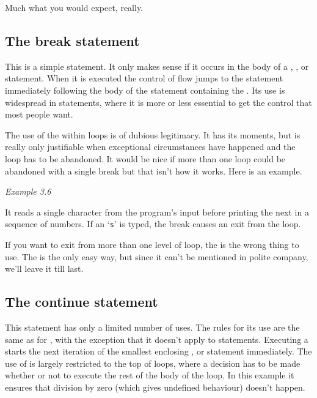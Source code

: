     Much what you would expect, really.


   

  

  \subsection{The break statement}
   

   This is a simple statement. It only makes sense if it occurs in the body
    of a \switch, \kdo, \while{} or
    \for{} statement. When it is executed the control of flow jumps
    to the statement immediately following the body of the statement
    containing the \kbreak. Its use is widespread in
    \switch{} statements, where it is more or less essential to get
    the control that most people want.


   The use of the \kbreak{} within loops is of dubious legitimacy.
    It has its moments, but is really only justifiable when exceptional
    circumstances have happened and the loop has to be abandoned. It would be
    nice if more than one loop could be abandoned with a single break but that
    isn't how it works. Here is an example.


    \begin{center}\textit{Example 3.6}\end{center}


   It reads a single character from the program's input before printing the
    next in a sequence of numbers. If an `\texttt{s}' is typed, the
    break causes an exit from the loop.


   If you want to exit from more than one level of loop, the
    \kbreak{} is the wrong thing to use. The \goto{} is the
    only easy way, but since it can't be mentioned in polite company, we'll
    leave it till last.


  

  \subsection{The continue statement}
   

   This statement has only a limited number of uses. The rules for its use
    are the same as for \kbreak, with the exception that it doesn't
    apply to \switch{} statements. Executing a \continue{}
    starts the next iteration of the smallest enclosing \kdo,
    \while{} or \for{} statement immediately. The use of
    \continue{} is largely restricted to the top of loops, where a
    decision has to be made whether or not to execute the rest of the body of
    the loop. In this example it ensures that division by zero (which gives
    undefined behaviour) doesn't happen.



